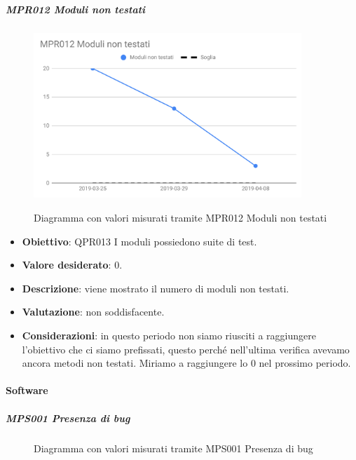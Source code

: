 		\subparagraph{MPR012 Moduli non testati}
	
	\begin{figure}[H]
		\centering
		\includegraphics[width=0.9\textwidth]{img/cruscotti/RQ/MPR012.png}
		\label{immaginePresenzaDupplicazioneCodiceRP}
		\caption{Diagramma con valori misurati tramite MPR012 Moduli non testati}
	\end{figure}
	
	\begin{itemize}
		\item \textbf{Obiettivo}: QPR013 I moduli possiedono suite di test.
		\item \textbf{Valore desiderato}: 0.
		\item \textbf{Descrizione}: viene mostrato il numero di moduli non testati.
		\item \textbf{Valutazione}: non soddisfacente.
		\item \textbf{Considerazioni}: in questo periodo non siamo riusciti a raggiungere l'obiettivo che ci siamo prefissati, questo perché nell'ultima verifica avevamo ancora metodi non testati. Miriamo a raggiungere lo 0 nel prossimo periodo.
	\end{itemize}
	
	\paragraph{Software}
	
	\subparagraph{MPS001 Presenza di bug}
	
	\begin{figure}[H]
		\centering
		\label{immaginePresenzaBugRP}
		\caption{Diagramma con valori misurati tramite MPS001 Presenza di bug}
	\end{figure}
	

